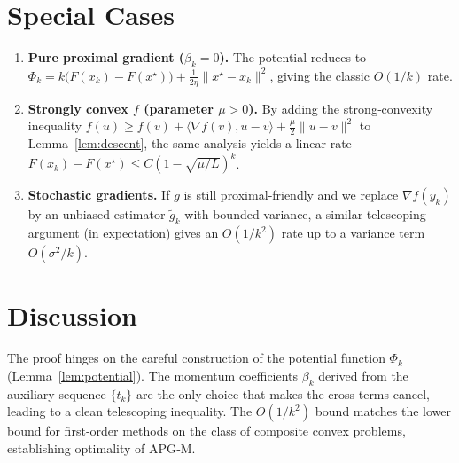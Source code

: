 \documentclass{article}
\begin{document}
\section*{Special Cases}
\begin{enumerate}[label=\arabic*)]
\item \textbf{Pure proximal gradient ($\beta_{k}=0$).}  
      The potential reduces to $\Phi_{k}=k\bigl(F(x_{k})-F(x^{\star})\bigr)
      +\frac{1}{2\eta}\|x^{\star}-x_{k}\|^{2}$, giving the classic $O(1/k)$ rate.

\item \textbf{Strongly convex $f$ (parameter $\mu>0$).}  
      By adding the strong‑convexity inequality
      $f(u)\ge f(v)+\langle\nabla f(v),u-v\rangle+\frac{\mu}{2}\|u-v\|^{2}$
      to Lemma~\ref{lem:descent}, the same analysis yields a linear rate
      $F(x_{k})-F(x^{\star})\le C(1-\sqrt{\mu/L})^{k}$.

\item \textbf{Stochastic gradients.}  
      If $g$ is still proximal‑friendly and we replace $\nabla f(y_{k})$ by an
      unbiased estimator $\tilde g_{k}$ with bounded variance, a similar
      telescoping argument (in expectation) gives an $O(1/k^{2})$ rate up to a
      variance term $O(\sigma^{2}/k)$.
\end{enumerate}

\section*{Discussion}
The proof hinges on the careful construction of the potential function
$\Phi_{k}$ (Lemma~\ref{lem:potential}).  The momentum coefficients $\beta_{k}$
derived from the auxiliary sequence $\{t_{k}\}$ are the only choice that makes
the cross terms cancel, leading to a clean telescoping inequality.  The
$O(1/k^{2})$ bound matches the lower bound for first‑order methods on the
class of composite convex problems, establishing optimality of APG‑M.
\end{document}
